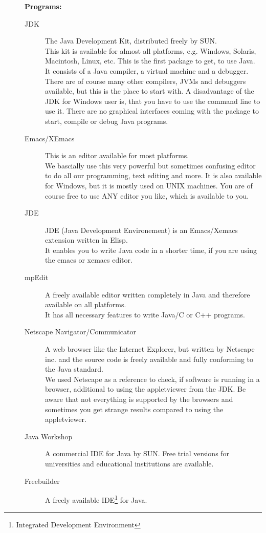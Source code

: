\begin{description}
\item[] \textbf{Programs:} 
\begin{description}
\item[JDK] The Java Development Kit, distributed freely by SUN.\\
        This kit is available for almost all platforms, e.g. Windows,
        Solaris, Macintosh, Linux, etc. This is the first package to get,
        to use Java. It consists of a Java compiler, a virtual machine 
        and a debugger. There
        are of course many other compilers, JVMs and debuggers
        available, but this is the place to start with. A disadvantage
        of the JDK for Windows user is, that you have to use the
        command line to use it. There are no graphical interfaces  coming with the
        package to start, compile or debug Java programs.
\item[Emacs/XEmacs] This is an editor available for most platforms.\\
        We bascially use this very powerful but sometimes confusing
        editor to do all our programming, text editing and more. It is
        also available for Windows, but it is mostly used on UNIX machines.
        You are of course free to use ANY editor you like, which is available
        to you. 
\item[JDE] JDE (Java Development Environement) is an Emacs/Xemacs extension
        written in Elisp. \\
        It enables you to write Java code in a shorter time, if you are
        using the emacs or xemacs editor. 
\item[mpEdit] A freely available editor written completely in Java and
  therefore available on all platforms.\\ 
  It has all necessary features to write Java/C or C++ programs.
\item[Netscape Navigator/Communicator] A web browser like the Internet 
        Explorer, but written by Netscape inc. and the source code is
        freely available and fully conforming to the Java standard. \\
        We used Netscape as a reference to check, if software is running
        in a browser, additional to using the appletviewer from the JDK.
        Be aware that not everything is supported by the browsers and
        sometimes you get strange results compared to using the
        appletviewer.       
\item[Java Workshop] A commercial IDE for Java by SUN. Free trial versions
  for universities and educational institutions are available.\\  
\item[Freebuilder] A freely available IDE\footnote{Integrated Development
    Environment} for Java. \\
\end{description}


\end{description}
